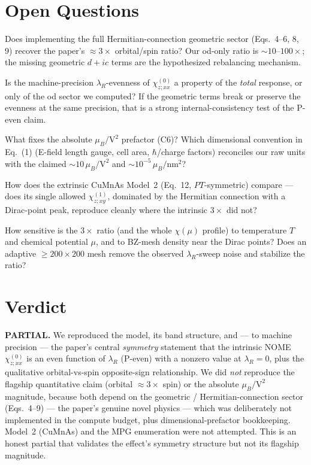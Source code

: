 \documentclass[11pt]{article}
\newcommand{\chizxx}{\chi^{(0)}_{z;xx}}
\newcommand{\lamR}{\lambda_{R}}
\newcommand{\muB}{\mu_{B}}
\begin{document}
\section*{Open Questions}
\begin{description}[leftmargin=2.2em,style=nextline]
\item[Q1.] Does implementing the full Hermitian-connection geometric
sector (Eqs.~4--6, 8, 9) recover the paper's $\approx 3\times$ orbital/spin
ratio? Our od-only ratio is $\sim\!10$--$100\times$; the missing geometric
$d+ic$ terms are the hypothesized rebalancing mechanism.
\item[Q2.] Is the machine-precision $\lamR$-evenness of $\chizxx$ a
property of the \emph{total} response, or only of the od sector we
computed? If the geometric terms break or preserve the evenness at the
same precision, that is a strong internal-consistency test of the P-even
claim.
\item[Q3.] What fixes the absolute $\muB/\mathrm{V}^2$ prefactor (C6)?
Which dimensional convention in Eq.~(1) (E-field length gauge, cell area,
$\hbar$/charge factors) reconciles our raw units with the claimed
$\sim\!10\,\muB/\mathrm{V}^2$ and $\sim\!10^{-5}\,\muB/\mathrm{nm}^2$?
\item[Q4.] How does the extrinsic CuMnAs Model~2 (Eq.~12, $PT$-symmetric)
compare --- does its single allowed $\chi^{(1)}_{z;xy}$, dominated by the
Hermitian connection with a Dirac-point peak, reproduce cleanly where the
intrinsic $3\times$ did not?
\item[Q5.] How sensitive is the $3\times$ ratio (and the whole
$\chi(\mu)$ profile) to temperature $T$ and chemical potential $\mu$, and
to BZ-mesh density near the Dirac points? Does an adaptive $\geq200\times200$
mesh remove the observed $\lamR$-sweep noise and stabilize the ratio?
\end{description}

\section{Verdict}
\textbf{PARTIAL.} We reproduced the model, its band structure, and --- to
machine precision --- the paper's central \emph{symmetry} statement that
the intrinsic NOME $\chizxx$ is an even function of $\lamR$ (P-even) with a
nonzero value at $\lamR=0$, plus the qualitative orbital-vs-spin
opposite-sign relationship. We did \emph{not} reproduce the flagship
quantitative claim (orbital $\approx 3\times$ spin) or the absolute
$\muB/\mathrm{V}^2$ magnitude, because both depend on the geometric /
Hermitian-connection sector (Eqs.~4--9) --- the paper's genuine novel
physics --- which was deliberately not implemented in the compute budget,
plus dimensional-prefactor bookkeeping. Model~2 (CuMnAs) and the MPG
enumeration were not attempted. This is an honest partial that validates
the effect's symmetry structure but not its flagship magnitude.
\end{document}
